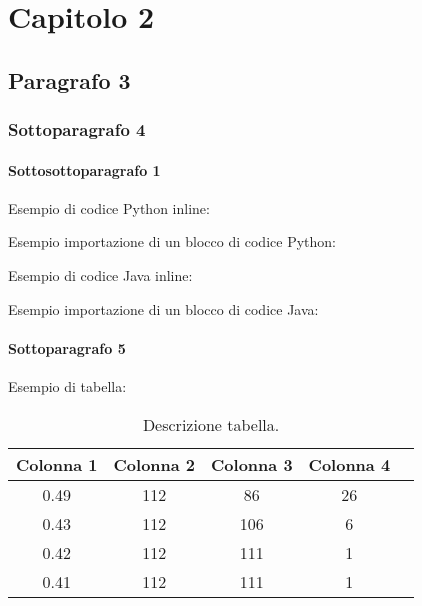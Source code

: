 \chapter{Capitolo 2}\label{Capitolo 2}

\section{Paragrafo 3}\label{Paragrafo3}

\subsection{Sottoparagrafo 4}\label{Sottoparagrafo4}

\subsubsection{Sottosottoparagrafo 1}\label{Sottosottoparagrafo1}

Esempio di codice Python inline: 

Esempio importazione di un blocco di codice Python:


Esempio di codice Java inline: 

Esempio importazione di un blocco di codice Java:


\subsubsection{Sottoparagrafo 5}\label{Sottoparagrafo5}

Esempio di tabella:

\begin{table}[H]
    \centering
    \begin{tabular}{|c|c|c|c|c|}
    \hline
    \textbf{Colonna 1}  & \textbf{Colonna 2}    & \textbf{Colonna 3}     & \textbf{Colonna 4}      \\ \hline
    0.49                & 112                   & 86                     & 26                      \\ \hline
    0.43                & 112                   & 106                    & 6                       \\ \hline
    0.42                & 112                   & 111                    & 1                       \\ \hline
    0.41                & 112                   & 111                    & 1                       \\ \hline
    \end{tabular}
    \caption{Descrizione tabella.}
\end{table}

